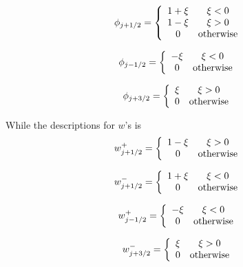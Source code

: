 \documentclass[12pt]{article}
\begin{document}
\begin{equation}
\phi_{j+1/2} = \left\lbrace \begin{array}{c c}
1 + \xi & \xi < 0 \\
1 - \xi & \xi > 0\\
0 & \text{otherwise}
\end{array} 
\right.
\end{equation}

\begin{equation}
\phi_{j-1/2} = \left\lbrace \begin{array}{c c}
-\xi & \xi < 0 \\
0 & \text{otherwise}
\end{array} 
\right.
\end{equation}

\begin{equation}
\phi_{j+3/2} = \left\lbrace \begin{array}{c c}
\xi & \xi > 0 \\
0 & \text{otherwise}
\end{array} 
\right.
\end{equation}

While the descriptions for $w$'s is
\begin{equation}
w^+_{j+1/2} = \left\lbrace \begin{array}{c c}
1-\xi & \xi > 0 \\
0 & \text{otherwise}
\end{array} 
\right.
\end{equation}

\begin{equation}
w^-_{j+1/2} = \left\lbrace \begin{array}{c c}
1+\xi & \xi < 0 \\
0 & \text{otherwise}
\end{array} 
\right.
\end{equation}

\begin{equation}
w^+_{j-1/2} = \left\lbrace \begin{array}{c c}
-\xi & \xi < 0 \\
0 & \text{otherwise}
\end{array} 
\right.
\end{equation}

\begin{equation}
w^-_{j+3/2} = \left\lbrace \begin{array}{c c}
\xi & \xi > 0 \\
0 & \text{otherwise}
\end{array} 
\right.
\end{equation}
\end{document}
